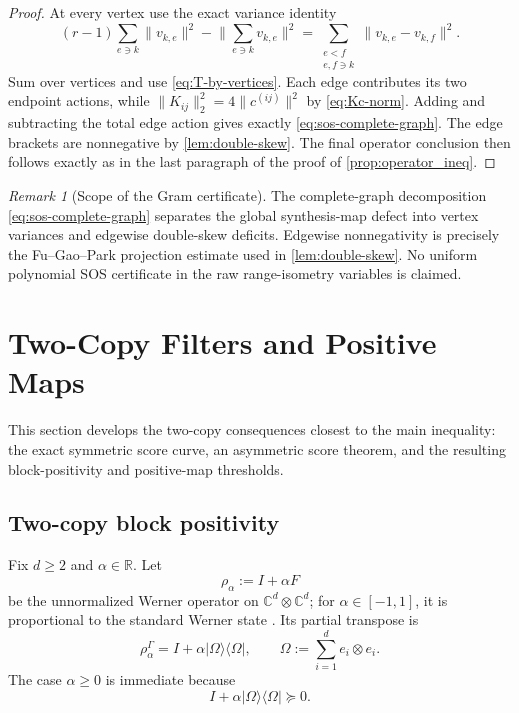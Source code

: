 \documentclass[11pt,reqno]{amsart}
\theoremstyle{remark}
\newtheorem{remark}[theorem]{Remark}
\newcommand{\ketbra}[2]{\lvert #1\rangle\!\langle #2\rvert}
\newcommand{\norm}[1]{\lVert #1\rVert}
\newcommand{\C}{\mathbb C}
\begin{document}
\begin{proof}
At every vertex use the exact variance identity
\[
    (r-1)\sum_{e\ni k}\norm{v_{k,e}}^2
    -\norm{\sum_{e\ni k}v_{k,e}}^2
    =
    \sum_{\substack{e<f\\e,f\ni k}}
    \norm{v_{k,e}-v_{k,f}}^2.
\]
Sum over vertices and use
\cref{eq:T-by-vertices}.  Each edge contributes its two endpoint
actions, while
$\norm{K_{ij}}_2^2=4\norm{c^{(ij)}}^2$ by
\cref{eq:Kc-norm}.  Adding and subtracting the total edge action gives
exactly \cref{eq:sos-complete-graph}.  The edge brackets are
nonnegative by \cref{lem:double-skew}.  The final operator conclusion
then follows exactly as in the last paragraph of the proof of
\cref{prop:operator_ineq}.
\end{proof}

\begin{remark}[Scope of the Gram certificate]
The complete-graph decomposition \cref{eq:sos-complete-graph}
separates the global synthesis-map defect into vertex variances and
edgewise double-skew deficits. Edgewise nonnegativity is precisely the
Fu--Gao--Park projection estimate used in \cref{lem:double-skew}.
No uniform polynomial SOS certificate in the raw range-isometry
variables is claimed.
\end{remark}

\section{Two-Copy Filters and Positive Maps}

This section develops the two-copy consequences closest to the
main inequality: the exact symmetric score curve, an asymmetric
score theorem, and the resulting block-positivity and positive-map
thresholds.

\subsection{Two-copy block positivity}

Fix $d\ge2$ and $\alpha\in\mathbb R$. Let
\[
    \rho_\alpha
    :=
    I+\alpha F
\]
be the unnormalized Werner operator on $\C^d\otimes\C^d$; for
$\alpha\in[-1,1]$, it is proportional to the standard Werner state
\cite{Werner1989}. Its partial transpose is
\[
    \rho_\alpha^\Gamma
    =
    I+\alpha\ketbra{\Omega}{\Omega},
    \qquad
    \Omega
    :=
    \sum_{i=1}^d e_i\otimes e_i.
\]
The case $\alpha\ge0$ is immediate because
\[
    I+\alpha\ketbra{\Omega}{\Omega}\succeq0.
\]
\end{document}
